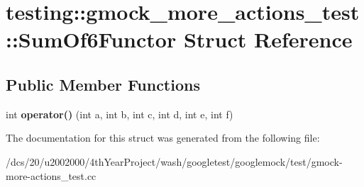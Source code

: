 \hypertarget{structtesting_1_1gmock__more__actions__test_1_1SumOf6Functor}{}\section{testing\+:\+:gmock\+\_\+more\+\_\+actions\+\_\+test\+:\+:Sum\+Of6\+Functor Struct Reference}
\label{structtesting_1_1gmock__more__actions__test_1_1SumOf6Functor}
\subsection*{Public Member Functions}
\begin{DoxyCompactItemize}
\item 
\mbox{\label{structtesting_1_1gmock__more__actions__test_1_1SumOf6Functor_adc0cc4dbd423db7298497b8a9630067e}} 
int {\bfseries operator()} (int a, int b, int c, int d, int e, int f)
\end{DoxyCompactItemize}


The documentation for this struct was generated from the following file\+:\begin{DoxyCompactItemize}
\item 
/dcs/20/u2002000/4th\+Year\+Project/wash/googletest/googlemock/test/gmock-\/more-\/actions\+\_\+test.\+cc\end{DoxyCompactItemize}
